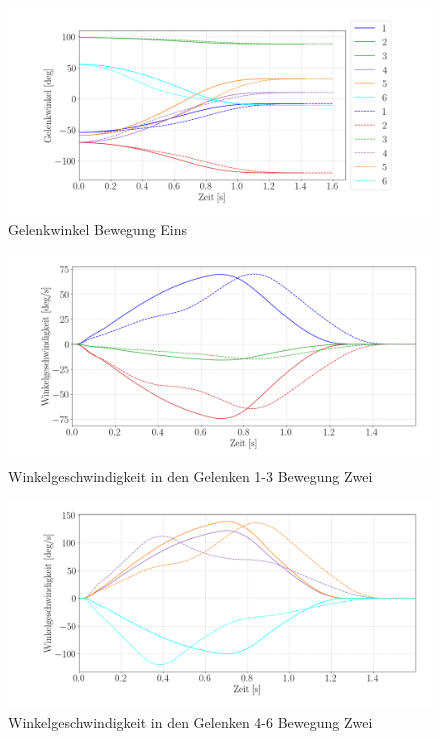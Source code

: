 \begin{figure}[tbph]
	\centering
	\includegraphics[width=1\linewidth]{images/aiposup}
	\caption{Gelenkwinkel Bewegung Eins}
	\label{fig:aiposup}
\end{figure}
\begin{figure}[tbph]
	\centering
	\includegraphics[width=1\linewidth]{images/velposup1}
	\caption{Winkelgeschwindigkeit in den Gelenken 1-3 Bewegung Zwei}
	\label{fig:velposup1}
\end{figure}
\begin{figure}[tbph]
	\centering
	\includegraphics[width=1\linewidth]{images/velposup2}
	\caption{Winkelgeschwindigkeit in den Gelenken 4-6 Bewegung Zwei}
	\label{fig:velposup2}
\end{figure}
